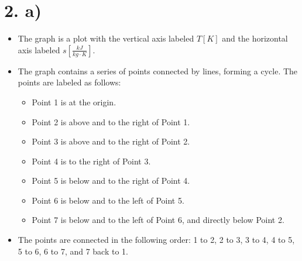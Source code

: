 \section*{2. a)}

\begin{itemize}
    \item The graph is a plot with the vertical axis labeled \( T [K] \) and the horizontal axis labeled \( s \left[ \frac{kJ}{kg \cdot K} \right] \).
    \item The graph contains a series of points connected by lines, forming a cycle. The points are labeled as follows:
    \begin{itemize}
        \item Point 1 is at the origin.
        \item Point 2 is above and to the right of Point 1.
        \item Point 3 is above and to the right of Point 2.
        \item Point 4 is to the right of Point 3.
        \item Point 5 is below and to the right of Point 4.
        \item Point 6 is below and to the left of Point 5.
        \item Point 7 is below and to the left of Point 6, and directly below Point 2.
    \end{itemize}
    \item The points are connected in the following order: 1 to 2, 2 to 3, 3 to 4, 4 to 5, 5 to 6, 6 to 7, and 7 back to 1.
\end{itemize}
